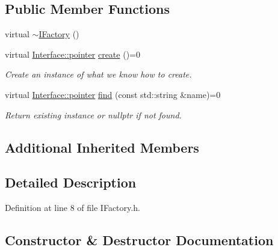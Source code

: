 \subsection*{Public Member Functions}
\begin{DoxyCompactItemize}
\item 
virtual \hyperlink{class_wire_cell_1_1_i_factory_a10e519030cca5b1ac2c64140be32aed9}{$\sim$\+I\+Factory} ()
\item 
virtual \hyperlink{class_wire_cell_1_1_interface_a09c548fb8266cfa39afb2e74a4615c37}{Interface\+::pointer} \hyperlink{class_wire_cell_1_1_i_factory_a179e399381c19d1b49bcce704cee5c96}{create} ()=0
\begin{DoxyCompactList}\small\item\em Create an instance of what we know how to create. \end{DoxyCompactList}\item 
virtual \hyperlink{class_wire_cell_1_1_interface_a09c548fb8266cfa39afb2e74a4615c37}{Interface\+::pointer} \hyperlink{class_wire_cell_1_1_i_factory_a4365897d9d1e7951ce53c553dba3e116}{find} (const std\+::string \&name)=0
\begin{DoxyCompactList}\small\item\em Return existing instance or nullptr if not found. \end{DoxyCompactList}\end{DoxyCompactItemize}
\subsection*{Additional Inherited Members}


\subsection{Detailed Description}


Definition at line 8 of file I\+Factory.\+h.



\subsection{Constructor \& Destructor Documentation}
\mbox{\label{class_wire_cell_1_1_i_factory_a10e519030cca5b1ac2c64140be32aed9}} 
